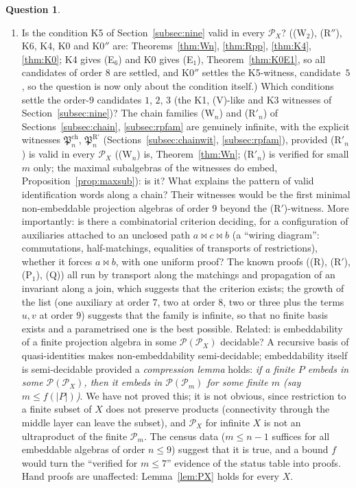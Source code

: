 \documentclass[11pt]{amsart}
\theoremstyle{definition}
\newtheorem{question}[theorem]{Question}
\renewcommand{\P}{\mathcal{P}}
\newcommand{\mt}{\bowtie}   %
\begin{document}
\begin{question}
\begin{enumerate}[label=\textup{(\arabic*)}]
\item Is the condition K5 of Section~\ref{subsec:nine} valid in every $\P_X$? ((W$_2$), (R$''$), K6, K4, K0 and K0$''$ are: Theorems~\ref{thm:Wn}, \ref{thm:Rpp}, \ref{thm:K4}, \ref{thm:K0}; K4 gives (E$_6$) and K0 gives (E$_1$), Theorem~\ref{thm:K0E1}, so all candidates of order $8$ are settled, and K0$''$ settles the K5-witness, candidate~$5$, so the question is now only about the condition itself.) Which conditions settle the order-$9$ candidates $1$, $2$, $3$ (the K1, (V)-like and K3 witnesses of Section~\ref{subsec:nine})? The chain families (W$_n$) and (R$'_n$) of Sections~\ref{subsec:chain}, \ref{subsec:rpfam} are genuinely infinite, with the explicit witnesses $\mathfrak P^{\mathrm{ch}}_n$, $\mathfrak P^{\mathrm R'}_n$ (Sections~\ref{subsec:chainwit}, \ref{subsec:rpfam}), provided (R$'_n$) is valid in every $\P_X$ ((W$_n$) is, Theorem~\ref{thm:Wn}; (R$'_n$) is verified for small $m$ only; the maximal subalgebras of the witnesses do embed, Proposition~\ref{prop:maxsub}): is it? What explains the pattern of valid identification words along a chain? Their witnesses would be the first minimal non-embeddable projection algebras of order $9$ beyond the (R$'$)-witness. More importantly: is there a combinatorial criterion deciding, for a configuration of auxiliaries attached to an unclosed path $a\mt c\mt b$ (a ``wiring diagram'': commutations, half-matchings, equalities of transports of restrictions), whether it forces $a\mt b$, with one uniform proof? The known proofs ((R), (R$'$), (P$_1$), (Q)) all run by transport along the matchings and propagation of an invariant along a join, which suggests that the criterion exists; the growth of the list (one auxiliary at order $7$, two at order $8$, two or three plus the terms $u,v$ at order $9$) suggests that the family is infinite, so that no finite basis exists and a parametrised one is the best possible. Related: is embeddability of a finite projection algebra in some $\P(\P_X)$ decidable? A recursive basis of quasi-identities makes non-embeddability semi-decidable; embeddability itself is semi-decidable provided a \emph{compression lemma} holds: \emph{if a finite $P$ embeds in some $\P(\P_X)$, then it embeds in $\P(\P_m)$ for some finite $m$ (say $m\le f(|P|)$)}. We have not proved this; it is not obvious, since restriction to a finite subset of $X$ does not preserve products (connectivity through the middle layer can leave the subset), and $\P_X$ for infinite $X$ is not an ultraproduct of the finite $\P_m$. The census data ($m\le n-1$ suffices for all embeddable algebras of order $n\le9$) suggest that it is true, and a bound $f$ would turn the ``verified for $m\le7$'' evidence of the status table into proofs. Hand proofs are unaffected: Lemma~\ref{lem:PX} holds for every $X$.

\end{enumerate}
\end{question}
\end{document}
